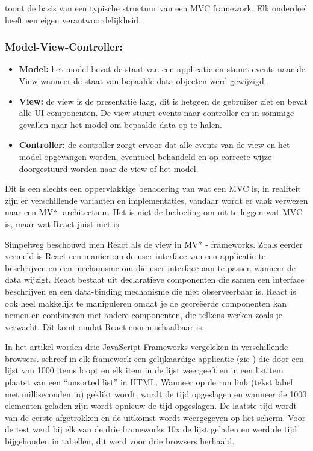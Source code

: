 	 toont de basis van een typische structuur van een MVC framework. Elk onderdeel heeft een eigen verantwoordelijkheid.
	
	\subsubsection*{Model-View-Controller:}
	\begin{itemize}
		\item \textbf{Model:} het model bevat de staat van een applicatie en stuurt events naar de View wanneer de staat van bepaalde data objecten werd gewijzigd.
		\item \textbf{View:} de view is de presentatie laag, dit is hetgeen de gebruiker ziet en bevat alle UI componenten. De view stuurt events naar controller en in sommige gevallen naar het model om bepaalde data op te halen.
		\item \textbf{Controller:} de controller zorgt ervoor dat alle events van de view en het model opgevangen worden, eventueel behandeld en op correcte wijze doorgestuurd worden naar de view of het model.
	\end{itemize}
	
	Dit is een slechts een oppervlakkige benadering van wat een MVC is, in realiteit zijn er verschillende varianten en implementaties, vandaar wordt er vaak verwezen naar een MV*- architectuur. Het is niet de bedoeling om uit te leggen wat MVC is, maar wat React juist niet is.
	
	Simpelweg beschouwd men React als de view in MV* - frameworks. Zoals eerder vermeld is React een manier om de user interface van een applicatie te beschrijven en een mechanisme om die user interface aan te passen wanneer de data wijzigt. React bestaat uit declaratieve componenten die samen een interface beschrijven en een data-binding mechanisme die niet observeerbaar is. React is ook heel makkelijk te manipuleren omdat je de gecreëerde componenten kan nemen en combineren met andere componenten, die telkens werken zoals je verwacht. Dit komt omdat React enorm schaalbaar is.
	
	In het artikel \cite{Harrington:React} worden drie JavaScript Frameworks vergeleken in verschillende browsers. \citeauthor{Harrington:React} schreef in elk framework een gelijkaardige applicatie (zie ) die door een lijst van 1000 items loopt en elk item in de lijst weergeeft en in een listitem plaatst van een ``unsorted list'' in HTML. Wanneer op de run link (tekst label met milliseconden in) geklikt wordt, wordt de tijd opgeslagen en wanneer de 1000 elementen geladen zijn wordt opnieuw de tijd opgeslagen. De laatste tijd wordt van de eerste afgetrokken en de uitkomst wordt weergegeven op het scherm. Voor de test werd bij elk van de drie frameworks 10x de lijst geladen en werd de tijd bijgehouden in tabellen, dit werd voor drie browsers herhaald.
	
